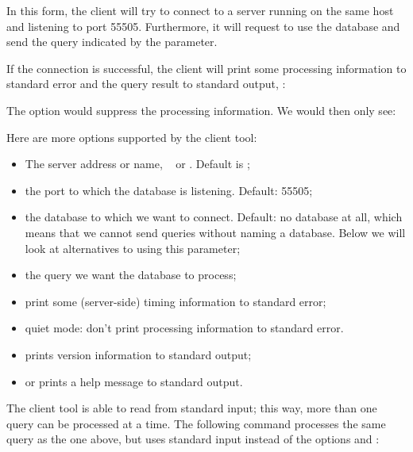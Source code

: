 In this form, the client will try to connect to a server
running on the same host and listening to port 55505.
Furthermore, it will request to use the database 
and send the query indicated by the  parameter.

If the connection is successful, the client will print some
processing information to standard error and the query result
to standard output, \eg:


The option  would suppress the processing information.
We would then only see:


Here are more options supported by the client tool:
\begin{itemize}
\item {} 
The server address or name, \eg\  or
. Default is ;

\item {}
the port to which the database is listening. Default: 55505;

\item {}
the database to which we want to connect. 
Default: no database at all, which means
that we cannot send queries without naming a database.
Below we will look at alternatives to using this parameter;

\item {}
the query we want the database to process;

\item {}
print some (server-side) timing information to standard error;

\item {}
quiet mode: don't print processing information to standard error.

\item {} prints version information to standard output;
\item {} or  prints a help message to standard output.
\end{itemize}

The client tool is able to read from standard input;
this way, more than one query can be processed at a time.
The following command processes the same query as the one above,
but uses standard input instead of the options  and :

